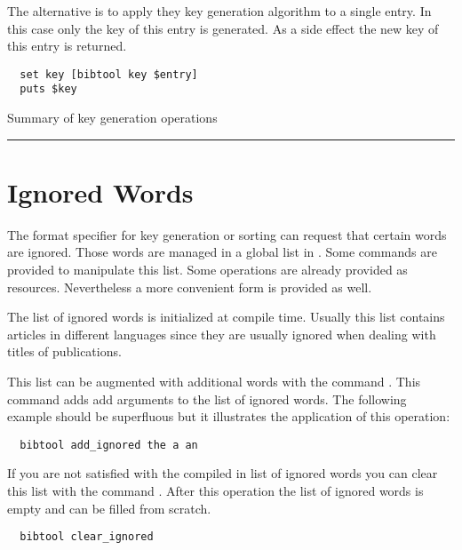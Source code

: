 The alternative is to apply they key generation algorithm to a single
entry. In this case only the key of this entry is generated. As a
side effect the new key of this entry is returned.
\begin{verbatim}
  set key [bibtool key $entry]
  puts $key
\end{verbatim}

\INCOMPLETE


\begin{table}[tp]
 
  \caption{Summary of key generation operations}\label{fig:tcl-keys}
  \rule{\textwidth}{.1pt}
\end{table}


\section{Ignored Words}

The format specifier for key generation or sorting can request that
certain words are ignored. Those words are managed in a global list in
\BibTool. Some commands are provided to manipulate this list. Some
operations are already provided as resources. Nevertheless a more
convenient form is provided as well.

The list of ignored words is initialized at compile time. Usually this
list contains articles in different languages since they are usually
ignored when dealing with titles of publications.

This list can be augmented with additional words with the command
. This command adds add arguments to the
list of ignored words. The following example should be superfluous but
it illustrates the application of this operation:
\begin{verbatim}
  bibtool add_ignored the a an
\end{verbatim}%

If you are not satisfied with the compiled in list of ignored words
you can clear this list with the command . After this operation the list of ignored words is
empty and can be filled from scratch.
\begin{verbatim}
  bibtool clear_ignored
\end{verbatim}%

